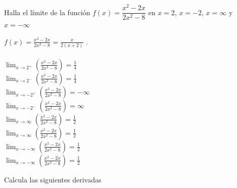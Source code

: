 \documentclass[addpoints,spanish, 12pt,a4paper]{exam}
\begin{document}
\begin{questions}

\question[2] Halla el límite de la función $f(x)=\dfrac{x^{2} - 2 x}{2 x^{2} - 8}$ en $x=2$, $x=-2$, $x=\infty$ y $x=-\infty$  


\begin{solution}
$f(x)=\frac{x^{2} - 2 x}{2 x^{2} - 8}=\frac{x}{2 \left(x + 2\right)}$ . \\  \\ $\lim_{x \to 2^+}\left(\frac{x^{2} - 2 x}{2 x^{2} - 8}\right)=\frac{1}{4}$ \\ $\lim_{x \to 2^-}\left(\frac{x^{2} - 2 x}{2 x^{2} - 8}\right)=\frac{1}{4}$ \\ $\lim_{x \to -2^+}\left(\frac{x^{2} - 2 x}{2 x^{2} - 8}\right)=-\infty$ \\ $\lim_{x \to -2^-}\left(\frac{x^{2} - 2 x}{2 x^{2} - 8}\right)=\infty$ \\ $\lim_{x \to \infty}\left(\frac{x^{2} - 2 x}{2 x^{2} - 8}\right)=\frac{1}{2}$ \\ $\lim_{x \to \infty}\left(\frac{x^{2} - 2 x}{2 x^{2} - 8}\right)=\frac{1}{2}$ \\ $\lim_{x \to -\infty}\left(\frac{x^{2} - 2 x}{2 x^{2} - 8}\right)=\frac{1}{2}$ \\ $\lim_{x \to -\infty}\left(\frac{x^{2} - 2 x}{2 x^{2} - 8}\right)=\frac{1}{2}$

\end{solution}


\addpoints

\question Calcula las siguientes derivadas 



\end{questions}
\end{document}
